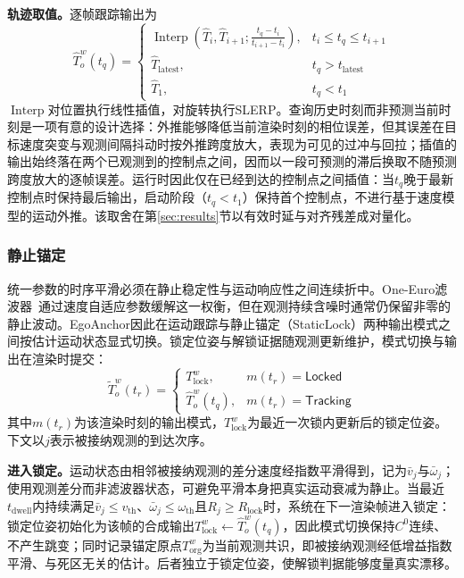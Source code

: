 \documentclass[review]{vgtc}
\begin{document}
\textbf{轨迹取值。}逐帧跟踪输出为
\begin{equation}
\widehat{T}_o^w(t_q) = \begin{cases}
\operatorname{Interp}\!\left(\widehat{T}_i, \widehat{T}_{i+1}; \frac{t_q - t_i}{t_{i+1} - t_i}\right), & t_i \leq t_q \leq t_{i+1} \\
\widehat{T}_{\mathrm{latest}}, & t_q > t_{\mathrm{latest}} \\
\widehat{T}_1, & t_q < t_1
\end{cases}
\label{eq:delayed-interp}
\end{equation}
$\operatorname{Interp}$对位置执行线性插值，对旋转执行SLERP。查询历史时刻而非预测当前时刻是一项有意的设计选择：外推能够降低当前渲染时刻的相位误差，但其误差在目标速度突变与观测间隔抖动时按外推跨度放大，表现为可见的过冲与回拉；插值的输出始终落在两个已观测到的控制点之间，因而以一段可预测的滞后换取不随预测跨度放大的逐帧误差。运行时因此仅在已经到达的控制点之间插值：当$t_q$晚于最新控制点时保持最后输出，启动阶段（$t_q < t_1$）保持首个控制点，不进行基于速度模型的运动外推。该取舍在第\ref{sec:results}节以有效时延与对齐残差成对量化。

\subsubsection{静止锚定}\label{sec:staticlock}

统一参数的时序平滑必须在静止稳定性与运动响应性之间连续折中。One-Euro滤波器~\cite{casiez2012oneeuro}通过速度自适应参数缓解这一权衡，但在观测持续含噪时通常仍保留非零的静止波动。EgoAnchor因此在运动跟踪与静止锚定（StaticLock）两种输出模式之间按估计运动状态显式切换。锁定位姿与解锁证据随观测更新维护，模式切换与输出在渲染时提交：
\begin{equation}
\widetilde{T}_o^w(t_r) = \begin{cases}
T_{\mathrm{lock}}^w, & m(t_r) = \mathsf{Locked} \\
\widehat{T}_o^w(t_q), & m(t_r) = \mathsf{Tracking}
\end{cases}
\label{eq:staticlock}
\end{equation}
其中$m(t_r)$为该渲染时刻的输出模式，$T_{\mathrm{lock}}^w$为最近一次锁内更新后的锁定位姿。下文以$j$表示被接纳观测的到达次序。

\textbf{进入锁定。}运动状态由相邻被接纳观测的差分速度经指数平滑得到，记为$\bar{v}_j$与$\bar{\omega}_j$；使用观测差分而非滤波器状态，可避免平滑本身把真实运动衰减为静止。当最近$t_{\mathrm{dwell}}$内持续满足$\bar{v}_j \leq v_{\mathrm{th}}$、$\bar{\omega}_j \leq \omega_{\mathrm{th}}$且$R_j \geq R_{\mathrm{lock}}$时，系统在下一渲染帧进入锁定：锁定位姿初始化为该帧的合成输出$T_{\mathrm{lock}}^w \leftarrow \widehat{T}_o^w(t_q)$，因此模式切换保持$C^0$连续、不产生跳变；同时记录锚定原点$T_{\mathrm{org}}^w$为当前观测共识，即被接纳观测经低增益指数平滑、与死区无关的估计。后者独立于锁定位姿，使解锁判据能够度量真实漂移。
\end{document}
